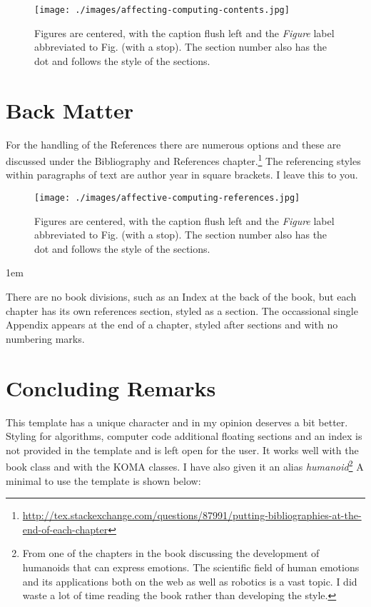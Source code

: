 \begin{figure}[ht]
\centering
\texttt{[image: ./images/affecting-computing-contents.jpg]}
\caption{Figures are centered, with the caption flush left and the \textit{Figure} label abbreviated to Fig. (with a stop). The section number also has the dot and follows the style of the sections.}
\label{fig:eight02}
\end{figure}

\section{Back Matter}



For the handling of the References there are numerous options and these are discussed under the Bibliography and References chapter.\footnote{\protect\url{http://tex.stackexchange.com/questions/87991/putting-bibliographies-at-the-end-of-each-chapter}} The referencing styles within paragraphs of text are author year in square brackets. I leave this to you.

\begin{figure}[ht]
\centering
\texttt{[image: ./images/affective-computing-references.jpg]}
\caption{Figures are centered, with the caption flush left and the \textit{Figure} label abbreviated to Fig. (with a stop). The section number also has the dot and follows the style of the sections.}
\label{fig:eight02}
\end{figure}

\parindent1em

There are no book divisions, such as an Index at the back of the book, but each chapter has its own references section, styled as a section. The occassional single Appendix appears at the end of a chapter, styled after sections and with no numbering marks.

\section{Concluding Remarks}

This template has a unique character and in my opinion deserves a bit better. Styling for algorithms, computer code additional floating sections and an index is not provided in the template and is left open for the user. It works well with the book class and with the KOMA classes. I have also given it an alias \emph{humanoid}\footnote{From one of the chapters in the book discussing the development of humanoids that can express emotions. The scientific field of human emotions and its applications both on the web as well as robotics is a vast topic. I did waste a lot of time reading the book rather than developing the style. } A minimal to use the template is shown below:

